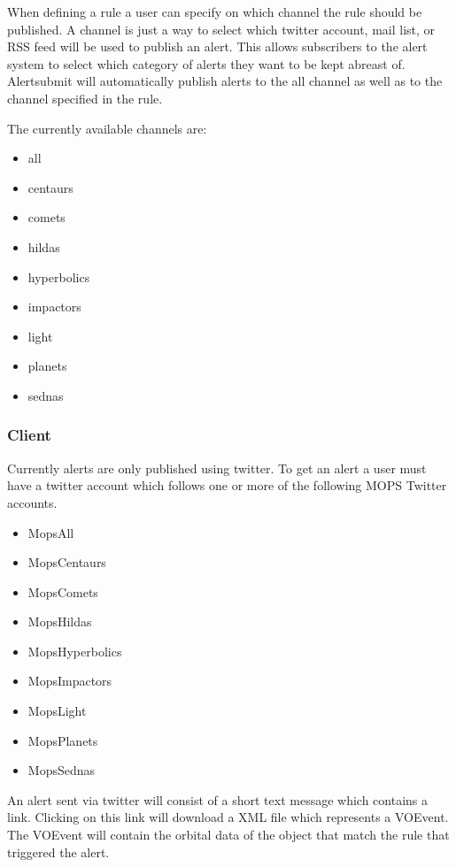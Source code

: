 \documentclass[panstarrs]{panstarrs}
\begin{document}
When defining a rule a user can specify on which channel the rule should be published. A channel is just a way to select which twitter account, mail list, or RSS feed will be used to publish an alert. This allows subscribers to the alert system to select which category of alerts they want to be kept abreast of. Alertsubmit will automatically publish alerts to the all channel as well as to the channel specified in the rule.

The currently available channels are:
\begin{itemize}
\item all
\item centaurs
\item comets
\item hildas
\item hyperbolics
\item impactors
\item light
\item planets
\item sednas 
\end{itemize}



\subsubsection{Client}
Currently alerts are only published using twitter. To get an alert a user must have a twitter account which follows one or more of the following MOPS Twitter accounts.

\begin{itemize}
\item MopsAll
\item MopsCentaurs
\item MopsComets
\item MopsHildas
\item MopsHyperbolics
\item MopsImpactors
\item MopsLight
\item MopsPlanets
\item MopsSednas 
\end{itemize}

An alert sent via twitter will consist of a short text message which contains a link. Clicking on this link will download a XML file which represents a VOEvent. The VOEvent will contain the orbital data of the object that match the rule that triggered the alert.
\end{document}
